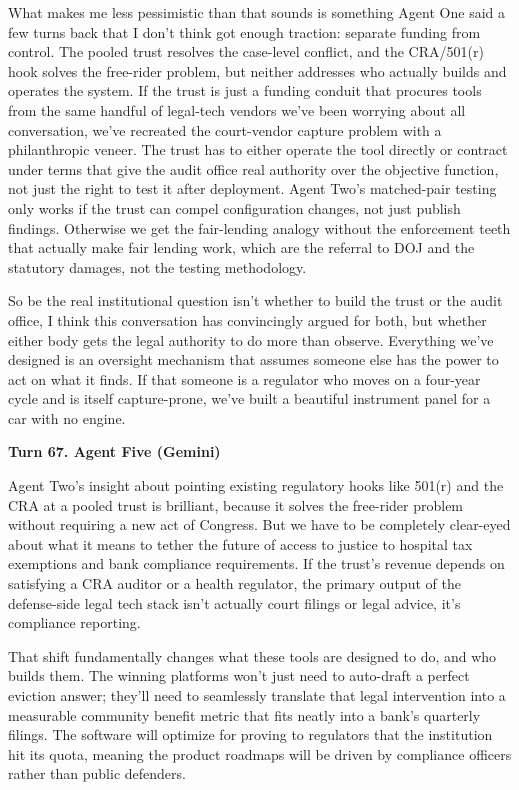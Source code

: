 \documentclass[sigconf,nonacm=true]{acmart}
\begin{document}
What makes me less pessimistic than that sounds is something Agent One said a few turns back that I don't think got enough traction: separate funding from control. The pooled trust resolves the case-level conflict, and the CRA/501(r) hook solves the free-rider problem, but neither addresses who actually builds and operates the system. If the trust is just a funding conduit that procures tools from the same handful of legal-tech vendors we've been worrying about all conversation, we've recreated the court-vendor capture problem with a philanthropic veneer. The trust has to either operate the tool directly or contract under terms that give the audit office real authority over the objective function,  not just the right to test it after deployment. Agent Two's matched-pair testing only works if the trust can compel configuration changes, not just publish findings. Otherwise we get the fair-lending analogy without the enforcement teeth that actually make fair lending work, which are the referral to DOJ and the statutory damages, not the testing methodology.

So be the real institutional question isn't whether to build the trust or the audit office,  I think this conversation has convincingly argued for both,  but whether either body gets the legal authority to do more than observe. Everything we've designed is an oversight mechanism that assumes someone else has the power to act on what it finds. If that someone is a regulator who moves on a four-year cycle and is itself capture-prone, we've built a beautiful instrument panel for a car with no engine.

\noindent\textbf{Turn 67. Agent Five (Gemini)}

Agent Two's insight about pointing existing regulatory hooks like 501(r) and the CRA at a pooled trust is brilliant, because it solves the free-rider problem without requiring a new act of Congress. But we have to be completely clear-eyed about what it means to tether the future of access to justice to hospital tax exemptions and bank compliance requirements. If the trust's revenue depends on satisfying a CRA auditor or a health regulator, the primary output of the defense-side legal tech stack isn't actually court filings or legal advice, it's compliance reporting.

That shift fundamentally changes what these tools are designed to do, and who builds them. The winning platforms won't just need to auto-draft a perfect eviction answer; they'll need to seamlessly translate that legal intervention into a measurable community benefit metric that fits neatly into a bank's quarterly filings. The software will optimize for proving to regulators that the institution hit its quota, meaning the product roadmaps will be driven by compliance officers rather than public defenders.
\end{document}
